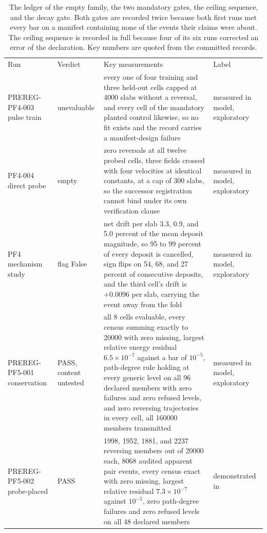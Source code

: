 \documentclass[aps,pre,reprint,nofootinbib,floatfix]{revtex4-2}
\begin{document}
\begin{table}[p]
\caption{The ledger of the empty family, the two mandatory gates, the
ceiling sequence, and the decay gate.  Both gates are recorded twice
because both first runs met every bar on a manifest containing none of
the events their claims were about.  The ceiling sequence is recorded
in full because four of its six runs corrected an error of the
declaration.  Key numbers are quoted from the committed records.}
\label{tab:ledger2}
\begin{ruledtabular}
\scriptsize
\begin{tabular}{L{2.5cm}L{1.9cm}L{9.0cm}L{2.7cm}}
Run & Verdict & Key measurements & Label \\
\colrule
PREREG-PF4-003 pulse train & unevaluable & every one of four training
and three held-out cells capped at 4000 slabs without a reversal, and
every cell of the mandatory planted control likewise, so no fit exists
and the record carries a manifest-design failure & measured in model,
exploratory \\
PF4-004 direct probe & empty & zero reversals at all twelve probed
cells, three fields crossed with four velocities at identical
constants, at a cap of 300 slabs, so the successor registration cannot
bind under its own verification clause & measured in model,
exploratory \\
PF4 mechanism study & flag False & net drift per slab 3.3, 0.9, and 5.0
percent of the mean deposit magnitude, so 95 to 99 percent of every
deposit is cancelled, sign flips on 54, 68, and 27 percent of
consecutive deposits, and the third cell's drift is $+0.0096$ per slab,
carrying the event away from the fold & measured in model,
exploratory \\
PREREG-PF5-001 conservation & PASS, content untested & all 8 cells
evaluable, every census summing exactly to 20000 with zero missing,
largest relative energy residual $6.5\times10^{-7}$ against a bar of
$10^{-5}$, path-degree rule holding at every generic level on all 96
declared members with zero failures and zero refused levels, and zero
reversing trajectories in every cell, all 160000 members transmitted &
measured in model, exploratory \\
PREREG-PF5-002 probe-placed & PASS & 1998, 1952, 1881, and 2237
reversing members out of 20000 each, 8068 audited apparent pair events,
every census exact with zero missing, largest relative residual
$7.3\times10^{-7}$ against $10^{-5}$, zero path-degree failures and
zero refused levels on all 48 declared members & demonstrated in

\end{tabular}
\end{ruledtabular}
\end{table}
\end{document}
